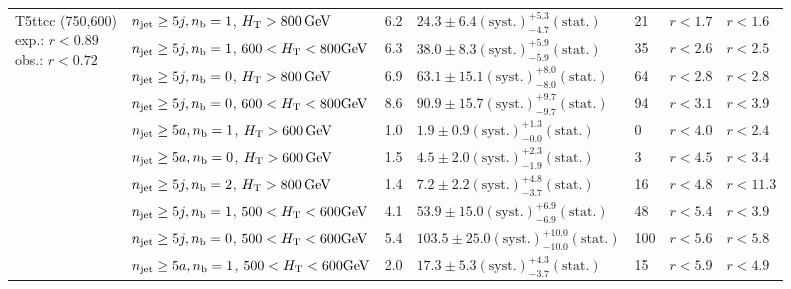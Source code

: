 \begin{table}[h!]
\begin{tabular}{ lllllll }
\multirow{10}{*}{\parbox[t]{2cm}{T5ttcc (750,600)\\exp.: $r<0.89$\\obs.: $r<0.72$}}
 & $n_{\mathrm{jet}} \geq5j,n_{\text{b}} =1$, $\mbox{$H_\text{T}$} > 800 \, \mathrm{GeV}$ & 6.2 & $24.3 \pm 6.4 \mathrm{(syst.)} ^{+5.3}_{-4.7} \mathrm{(stat.)}$ & 21 & $r < 1.7$ & $r < 1.6$\\ 
 & $n_{\mathrm{jet}} \geq5j,n_{\text{b}} =1$, $600 < \mbox{$H_\text{T}$} < 800 \mathrm{GeV}$ & 6.3 & $38.0 \pm 8.3 \mathrm{(syst.)} ^{+5.9}_{-5.9} \mathrm{(stat.)}$ & 35 & $r < 2.6$ & $r < 2.5$\\ 
 & $n_{\mathrm{jet}} \geq5j,n_{\text{b}} =0$, $\mbox{$H_\text{T}$} > 800 \, \mathrm{GeV}$ & 6.9 & $63.1 \pm 15.1 \mathrm{(syst.)} ^{+8.0}_{-8.0} \mathrm{(stat.)}$ & 64 & $r < 2.8$ & $r < 2.8$\\ 
 & $n_{\mathrm{jet}} \geq5j,n_{\text{b}} =0$, $600 < \mbox{$H_\text{T}$} < 800 \mathrm{GeV}$ & 8.6 & $90.9 \pm 15.7 \mathrm{(syst.)} ^{+9.7}_{-9.7} \mathrm{(stat.)}$ & 94 & $r < 3.1$ & $r < 3.9$\\ 
 & $n_{\mathrm{jet}} \geq5a,n_{\text{b}} =1$, $\mbox{$H_\text{T}$} > 600 \, \mathrm{GeV}$ & 1.0 & $1.9 \pm 0.9 \mathrm{(syst.)} ^{+1.3}_{-0.0} \mathrm{(stat.)}$ & 0 & $r < 4.0$ & $r < 2.4$\\ 
 & $n_{\mathrm{jet}} \geq5a,n_{\text{b}} =0$, $\mbox{$H_\text{T}$} > 600 \, \mathrm{GeV}$ & 1.5 & $4.5 \pm 2.0 \mathrm{(syst.)} ^{+2.3}_{-1.9} \mathrm{(stat.)}$ & 3 & $r < 4.5$ & $r < 3.4$\\ 
 & $n_{\mathrm{jet}} \geq5j,n_{\text{b}} =2$, $\mbox{$H_\text{T}$} > 800 \, \mathrm{GeV}$ & 1.4 & $7.2 \pm 2.2 \mathrm{(syst.)} ^{+4.8}_{-3.7} \mathrm{(stat.)}$ & 16 & $r < 4.8$ & $r < 11.3$\\ 
 & $n_{\mathrm{jet}} \geq5j,n_{\text{b}} =1$, $500 < \mbox{$H_\text{T}$} < 600 \mathrm{GeV}$ & 4.1 & $53.9 \pm 15.0 \mathrm{(syst.)} ^{+6.9}_{-6.9} \mathrm{(stat.)}$ & 48 & $r < 5.4$ & $r < 3.9$\\ 
 & $n_{\mathrm{jet}} \geq5j,n_{\text{b}} =0$, $500 < \mbox{$H_\text{T}$} < 600 \mathrm{GeV}$ & 5.4 & $103.5 \pm 25.0 \mathrm{(syst.)} ^{+10.0}_{-10.0} \mathrm{(stat.)}$ & 100 & $r < 5.6$ & $r < 5.8$\\ 
 & $n_{\mathrm{jet}} \geq5a,n_{\text{b}} =1$, $500 < \mbox{$H_\text{T}$} < 600 \mathrm{GeV}$ & 2.0 & $17.3 \pm 5.3 \mathrm{(syst.)} ^{+4.3}_{-3.7} \mathrm{(stat.)}$ & 15 & $r < 5.9$ & $r < 4.9$\\ \hline
    \hline
  \end{tabular}
\end{table}

